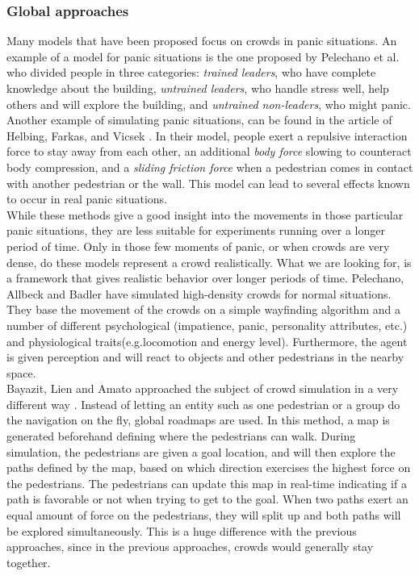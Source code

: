 \documentclass[11pt]{article}
\begin{document}
\subsubsection{Global approaches}
Many models that have been proposed focus on crowds in panic situations. An example of a model for panic situations is the one proposed by Pelechano et al. \cite{citeulike1080090} who divided people in three categories: \emph{trained leaders}, who have complete knowledge about the building, \emph{untrained leaders}, who handle stress well, help others and will explore the building, and \emph{untrained non-leaders}, who might panic.  Another example of simulating panic situations, can be found in the article of Helbing, Farkas, and Vicsek \cite{citeulike1656038}. In their model, people exert a repulsive interaction force to stay away from each other, an additional \emph{body force} slowing to counteract body compression, and a \emph{sliding friction force} when a pedestrian comes in contact with another pedestrian or the wall. This model can lead to several effects known to occur in real panic situations.\\
While these methods give a good insight into the movements in those particular panic situations, they are less suitable for experiments running over a longer period of time. Only in those few moments of panic, or when crowds are very dense, do these models represent a crowd realistically. What we are looking for, is a framework that gives realistic behavior over longer periods of time. Pelechano, Allbeck and Badler \cite{Pelechano:2007:CIA:1272690.1272705} have simulated high-density crowds for normal situations. They base the movement of the crowds on a simple wayfinding algorithm and a number of different psychological (impatience, panic, personality attributes, etc.) and physiological traits(e.g.locomotion and energy level). Furthermore, the agent is given perception and will react to objects and other pedestrians in the nearby space.\\
Bayazit, Lien and Amato approached the subject of crowd simulation in a very different way \cite{Bayazit02bettergroup}. Instead of letting an entity such as one pedestrian or a group do the navigation on the fly, global roadmaps are used. In this method, a map is generated beforehand defining where the pedestrians can walk. During simulation, the pedestrians are given a goal location, and will then explore the paths defined by the map, based on which direction exercises the highest force on the pedestrians. The pedestrians can update this map in real-time indicating if a path is favorable or not when trying to get to the goal. When two paths exert an equal amount of force on the pedestrians, they will split up and both paths will be explored simultaneously.  This is a huge difference with the previous approaches, since in the previous approaches, crowds would generally stay together. 
\end{document}
